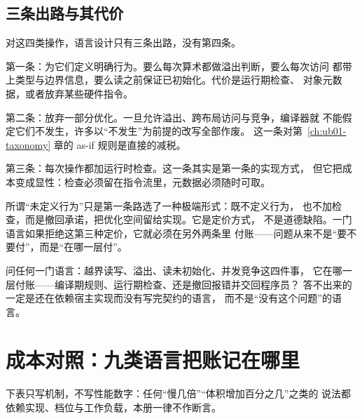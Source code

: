 \documentclass[12pt,a4paper,fontset=fandol]{ctexbook}
\begin{document}
\subsection{三条出路与其代价}\label{sec:ub02-three-ways}

对这四类操作，语言设计只有三条出路，没有第四条。

第一条：为它们定义明确行为。要么每次算术都做溢出判断，要么每次访问
都带上类型与边界信息，要么读之前保证已初始化。代价是运行期检查、
对象元数据，或者放弃某些硬件指令。

第二条：放弃一部分优化。一旦允许溢出、跨布局访问与竞争，编译器就
不能假定它们不发生，许多以“不发生”为前提的改写全部作废。
这一条对第~\ref{ch:ub01-taxonomy} 章的 as-if 规则是直接的减税。

第三条：每次操作都加运行时检查。这一条其实是第一条的实现方式，
但它把成本变成显性：检查必须留在指令流里，元数据必须随时可取。

所谓“未定义行为”只是第一条路选了一种极端形式：既不定义行为，
也不加检查，而是撤回承诺，把优化空间留给实现。它是定价方式，
不是道德缺陷。一门语言如果拒绝这第三种定价，它就必须在另外两条里
付账——问题从来不是“要不要付”，而是“在哪一层付”。

\begin{guideline}[title={一条可以拿去检验的判据}]
问任何一门语言：越界读写、溢出、读未初始化、并发竞争这四件事，
它在哪一层付账——编译期规则、运行期检查、还是撤回报错并交回程序员？
答不出来的一定是还在依赖宿主实现而没有写完契约的语言，
而不是“没有这个问题”的语言。
\end{guideline}

\section{成本对照：九类语言把账记在哪里}\label{sec:ub02-cost}

下表只写机制，不写性能数字：任何“慢几倍”“体积增加百分之几”之类的
说法都依赖实现、档位与工作负载，本册一律不作断言。
\end{document}
